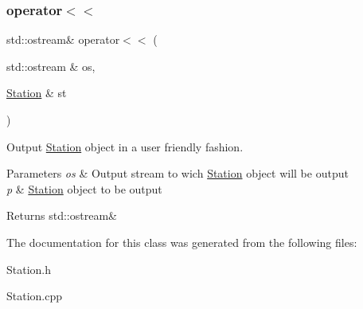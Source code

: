 \subsubsection{\texorpdfstring{operator$<$$<$}{operator<<}}
{\footnotesize\ttfamily std\+::ostream\& operator$<$$<$ (\begin{DoxyParamCaption}\item[{std\+::ostream \&}]{os,  }\item[{\mbox{\hyperlink{classStation}{Station}} \&}]{st }\end{DoxyParamCaption})\hspace{0.3cm}{\ttfamily [friend]}}



Output \mbox{\hyperlink{classStation}{Station}} object in a user friendly fashion. 


\begin{DoxyParams}{Parameters}
{\em os} & Output stream to wich \mbox{\hyperlink{classStation}{Station}} object will be output \\
\hline
{\em p} & \mbox{\hyperlink{classStation}{Station}} object to be output \\
\hline
\end{DoxyParams}
\begin{DoxyReturn}{Returns}
std\+::ostream\& 
\end{DoxyReturn}


The documentation for this class was generated from the following files\+:\begin{DoxyCompactItemize}
\item 
Station.\+h\item 
Station.\+cpp\end{DoxyCompactItemize}
